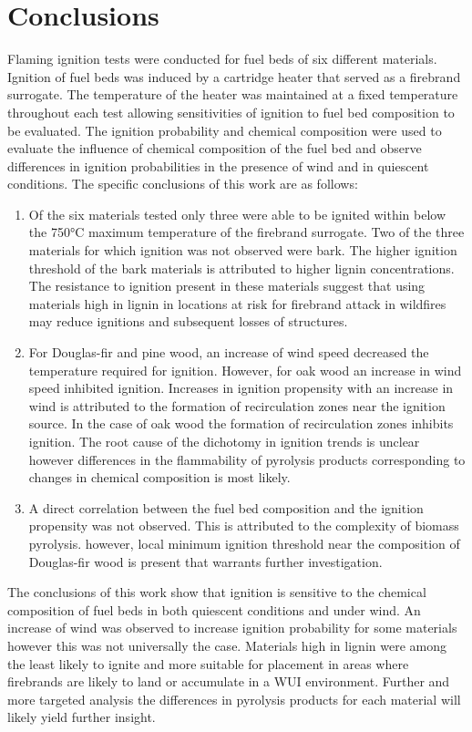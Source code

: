 \section{Conclusions}
\label{sec:conclusions3}    
    Flaming ignition tests were conducted for fuel beds of six different materials. Ignition of fuel beds was induced by a cartridge heater that served as a firebrand surrogate. The temperature of the heater was maintained at a fixed temperature throughout each test allowing sensitivities of ignition to fuel bed composition to be evaluated. The ignition probability and chemical composition were used to evaluate the influence of chemical composition of the fuel bed and observe differences in ignition probabilities in the presence of wind and in quiescent conditions. The specific conclusions of this work are as follows:
        \begin{enumerate}
            \item Of the six materials tested only three were able to be ignited within below the 750\si{\celsius} maximum temperature of the firebrand surrogate. Two of the three materials for which ignition was not observed were bark. The higher ignition threshold of the bark materials is attributed to higher lignin concentrations. The resistance to ignition present in these materials suggest that using materials high in lignin in locations at risk for firebrand attack in wildfires may reduce ignitions and subsequent losses of structures.
            
            \item For Douglas-fir and pine wood, an increase of wind speed decreased the temperature required for ignition. However, for oak wood an increase in wind speed inhibited ignition. Increases in ignition propensity with an increase in wind is attributed to the formation of recirculation zones near the ignition source. In the case of oak wood the formation of recirculation zones inhibits ignition. The root cause of the dichotomy in ignition trends is unclear however differences in the flammability of pyrolysis products corresponding to changes in chemical composition is most likely.
            
            \item A direct correlation between the fuel bed composition and the ignition propensity was not observed. This is attributed to the complexity of biomass pyrolysis. however, local minimum ignition threshold near the composition of Douglas-fir wood is present that warrants further investigation. 
        \end{enumerate}
    The conclusions of this work show that ignition is sensitive to the chemical composition of fuel beds in both quiescent conditions and under wind. An increase of wind was observed to increase ignition probability for some materials however this was not universally the case. Materials high in lignin were among the least likely to ignite and more suitable for placement in areas where firebrands are likely to land or accumulate in a WUI environment. Further and more targeted analysis the differences in pyrolysis products for each material will likely yield further insight. 
    

    
   